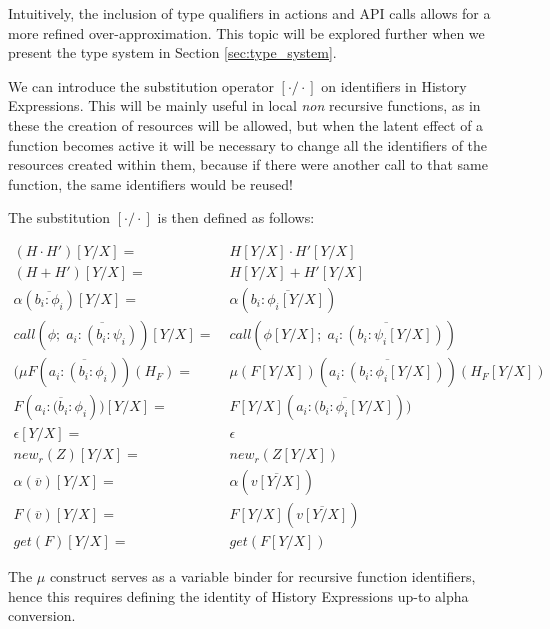 Intuitively, the inclusion of type qualifiers in actions and API calls allows for a more refined over-approximation. This topic will be explored further when we present the type system in Section \ref{sec:type_system}.

We can introduce the substitution operator $[\cdot/\cdot]$ on identifiers in History Expressions. This will be mainly useful in local \emph{non} recursive functions, as in these the creation of resources will be allowed, but when the latent effect of a function becomes active it will be necessary to change all the identifiers of the resources created within them, because if there were another call to that same function, the same identifiers would be reused!

\newpage

The substitution $[\cdot/\cdot]$ is then defined as follows:

\begin{equation}
    \begin{split}
        (H \cdot H')[Y/X] =&\; H[Y/X] \cdot H'[Y/X] \\
        (H + H')[Y/X] =&\; H[Y/X] + H'[Y/X] \\
        \alpha(\overline{b_i{:}\phi_i})[Y/X] = &\; \alpha(\overline{b_i{:}\phi_i[Y/X]}) \\
        call(\phi; \;\overline{a_i{:}(b_i{:}\psi_i)})[Y/X] = &\; call(\phi[Y/X]; \;\overline{a_i{:}(b_i{:}\psi_i[Y/X])}) \\
        (\mu F(\overline{a_i{:}({b_i{:}\phi_i})})(H_F) =& \;\mu(F[Y/X])(\overline{a_i{:}({b_i{:}\phi_i[Y/X]})})(H_F[Y/X]) \\
        F(\overline{a_i{:}(b_i{:}\phi_i}))[Y/X] =& \; F[Y/X](\overline{a_i{:}(b_i{:}\phi_i[Y/X]})) \\
        \epsilon[Y/X] =& \;\epsilon \\
        new_r(Z)[Y/X] = &\; new_r(Z[Y/X]) \\
        \alpha(\overline{v})[Y/X] =& \;\alpha(\overline{v[Y/X]}) \\
        F(\overline{v})[Y/X] =& \;F[Y/X](\overline{v[Y/X]}) \\
        get(F)[Y/X] =& \;get(F[Y/X])
    \end{split}
    \label{eq:subst}
\end{equation}

The $\mu$ construct serves as a variable binder for recursive function identifiers, hence this requires defining the identity of History Expressions up-to alpha conversion.

